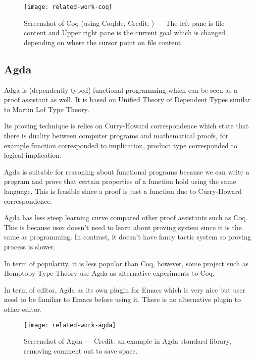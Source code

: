 \documentclass[master.tex]{subfiles}
\begin{document}
\begin{figure}[H]
    \centering
    \texttt{[image: related-work-coq]}
    \caption{Screenshot of Coq (using CoqIde, Credit:
      \cite{coq-official-website}) --- The left pane is file content and Upper
      right pane is the current goal which is changed depending on where the
      cursor point on file content.}
\label{fig:related-work-coq}
\end{figure}

\subsection{Agda}
Adga\supercite{agda-official-website} is (dependently typed) functional
programming which can be seen as a proof assistant as well. It is based on
Unified Theory of Dependent
Types\supercite{norell:thesis}\supercite{Luo:1994:CRT:184757} similar to Martin
Lof Type Theory.

Its proving technique is relies on Curry-Howard correspondence
which state that there is duality between computer programs and mathematical
proofs\supercite{curry-howard-correspondence}, for example function corresponded
to implication, product type corresponded to logical implication.

Agda is suitable for reasoning about functional programs because we can write a
program and prove that certain properties of a function hold using the same
language. This is feasible since a proof is just a function due to Curry-Howard
correspondence.

Agda has less steep learning curve compared other proof assistants such as Coq.
This is because user doesn't need to learn about proving
system since it is the same as programming. In contrast, it doesn't have
fancy tactic system so proving process is slower.

In term of popularity, it is less popular than Coq, however, some project such
as Homotopy Type Theory\supercite{hott-coq-repo}\supercite{hott-agda-repo} use
Agda as alternative experiments to Coq.

In term of editor, Agda as its own plugin for Emacs which is very nice but user
need to be familiar to Emacs before using it. There is no alternative plugin to
other editor.

\begin{figure}[H]
    \centering
    \texttt{[image: related-work-agda]}
    \caption{Screenshot of Agda --- Credit: an example in Agda standard library,
    removing comment out to save space.}
\label{fig:related-work-agda}
\end{figure}
\end{document}
